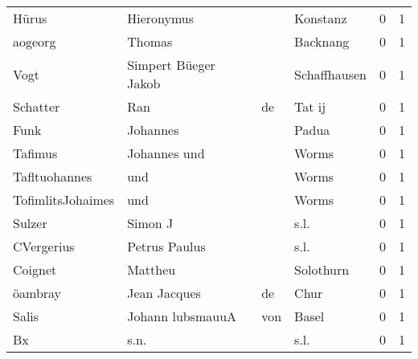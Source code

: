 \documentclass[10pt,a4paper,landscape]{article}
\begin{document}
\begin{longtable}{llllrr}
                    Hürus &                         Hieronymus &             &                                    Konstanz &          0 &         1 \\
                  aogeorg &                             Thomas &             &                                    Backnang &          0 &         1 \\
                     Vogt &               Simpert Büeger Jakob &             &                                Schaffhausen &          0 &         1 \\
                 Schatter &                                Ran &          de &                                      Tat ij &          0 &         1 \\
                     Funk &                           Johannes &             &                                       Padua &          0 &         1 \\
                  Tafimus &                       Johannes und &             &                                       Worms &          0 &         1 \\
            Tafltuohannes &                                und &             &                                       Worms &          0 &         1 \\
        TofimlitsJohaimes &                                und &             &                                       Worms &          0 &         1 \\
                   Sulzer &                            Simon J &             &                                        s.l. &          0 &         1 \\
               CVergerius &                      Petrus Paulus &             &                                        s.l. &          0 &         1 \\
                  Coignet &                            Mattheu &             &                                   Solothurn &          0 &         1 \\
                  öambray &                       Jean Jacques &          de &                                        Chur &          0 &         1 \\
                    Salis &                  Johann  lubsmauuA &         von &                                       Basel &          0 &         1 \\
                       Bx &                               s.n. &             &                                        s.l. &          0 &         1 \\

\end{longtable}
\end{document}

